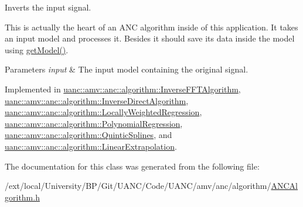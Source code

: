 Inverts the input signal. 

This is actually the heart of an A\+NC algorithm inside of this application. It takes an input model and processes it. Besides it should save its data inside the model using \hyperlink{classuanc_1_1amv_1_1anc_1_1algorithm_1_1_a_n_c_algorithm_a12ce80f6746cbb440cf771fc6878f7cf}{get\+Model()}.


\begin{DoxyParams}{Parameters}
{\em input} & The input model containing the original signal. \\
\hline
\end{DoxyParams}


Implemented in \hyperlink{classuanc_1_1amv_1_1anc_1_1algorithm_1_1_inverse_f_f_t_algorithm_a75d38b5ce03bca80a856dfa257f590a4}{uanc\+::amv\+::anc\+::algorithm\+::\+Inverse\+F\+F\+T\+Algorithm}, \hyperlink{classuanc_1_1amv_1_1anc_1_1algorithm_1_1_inverse_direct_algorithm_a4bd1bdcd128aee1f608be51660528954}{uanc\+::amv\+::anc\+::algorithm\+::\+Inverse\+Direct\+Algorithm}, \hyperlink{classuanc_1_1amv_1_1anc_1_1algorithm_1_1_locally_weighted_regression_aff29174e1b6f86e8a98ee9e9019b4e0d}{uanc\+::amv\+::anc\+::algorithm\+::\+Locally\+Weighted\+Regression}, \hyperlink{classuanc_1_1amv_1_1anc_1_1algorithm_1_1_polynomial_regression_a89422988308d10ec2871e92e3673c13d}{uanc\+::amv\+::anc\+::algorithm\+::\+Polynomial\+Regression}, \hyperlink{classuanc_1_1amv_1_1anc_1_1algorithm_1_1_quintic_splines_a8ca477544754bcf0e70a84ccc5b6e7d6}{uanc\+::amv\+::anc\+::algorithm\+::\+Quintic\+Splines}, and \hyperlink{classuanc_1_1amv_1_1anc_1_1algorithm_1_1_linear_extrapolation_aafb6717c9cb632241b10875630970388}{uanc\+::amv\+::anc\+::algorithm\+::\+Linear\+Extrapolation}.



The documentation for this class was generated from the following file\+:\begin{DoxyCompactItemize}
\item 
/ext/local/\+University/\+B\+P/\+Git/\+U\+A\+N\+C/\+Code/\+U\+A\+N\+C/amv/anc/algorithm/\hyperlink{_a_n_c_algorithm_8h}{A\+N\+C\+Algorithm.\+h}\end{DoxyCompactItemize}
